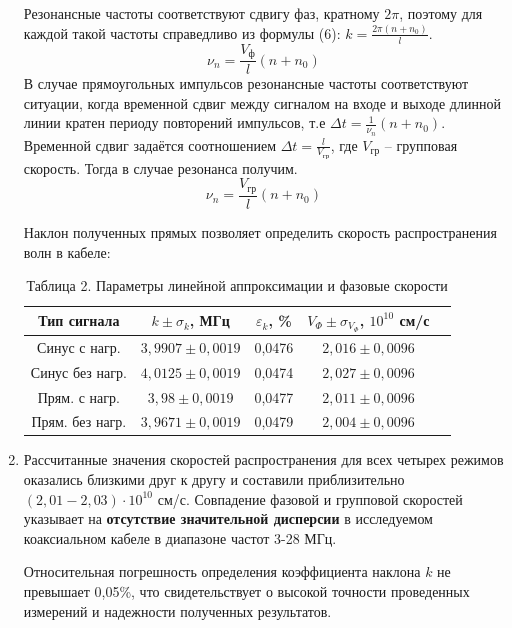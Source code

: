 \documentclass[a4paper]{article}
\begin{document}
\begin{enumerate}
Резонансные частоты соответствуют сдвигу фаз, кратному $2\pi$, поэтому для каждой такой частоты справедливо из формулы (6): $k=\frac{2\pi (n+n_0)}{l}$.  
\begin{equation}
 		\nu_n=\frac{V_\text{ф}}{l}(n+n_0)
	\end{equation}
В случае прямоугольных импульсов резонансные частоты соответствуют ситуации, когда
	временной сдвиг между сигналом на входе и выходе длинной линии кратен периоду
	повторений импульсов, т.е $\Delta t = \frac{1}{\nu_n}(n+n_0)$. Временной сдвиг задаётся соотношением
	$\Delta t=\frac{l}{V_\text{гр}}$, где $V_\text{гр}$ -- групповая скорость. Тогда в случае резонанса получим.
	\begin{equation}
		\nu_n=\frac{V_\text{гр}}{l}(n+n_0)
	\end{equation}

Наклон полученных прямых позволяет определить скорость распространения волн в кабеле:
 \clearpage
\begin{table}[h!]
    \centering
    \begin{tabular}{|c|c|c|c|c|}
        \hline
        Тип сигнала & $k \pm \sigma_k$, МГц & $\varepsilon_k$, \% & $V_{\Phi} \pm \sigma_{V_{\Phi}}$, $10^{10}$ см/с  \\ \hline
        Синус с нагр. & $3,9907 \pm 0,0019$ & 0,0476 & $2,016 \pm 0,0096$ \\ \hline
        Синус без нагр. & $4,0125 \pm 0,0019$ & 0,0474 & $2,027 \pm 0,0096$  \\ \hline
        Прям. с нагр. & $3,98 \pm 0,0019$ & 0,0477 & $2,011 \pm 0,0096$  \\ \hline
        Прям. без нагр. & $3,9671 \pm 0,0019$ & 0,0479 & $2,004 \pm 0,0096$ \\ \hline
    \end{tabular}
    \caption{Таблица 2. Параметры линейной аппроксимации и фазовые скорости}
    \label{tab:velocity_params}
\end{table}

\item Рассчитанные значения скоростей распространения для всех четырех режимов оказались близкими друг к другу и составили приблизительно $(2,01-2,03) \cdot 10^{10}$ см/с. Совпадение фазовой и групповой скоростей указывает на \textbf{отсутствие значительной дисперсии} в исследуемом коаксиальном кабеле в диапазоне частот 3-28 МГц.

Относительная погрешность определения коэффициента наклона $k$ не превышает 0,05\%, что свидетельствует о высокой точности проведенных измерений и надежности полученных результатов.


\end{enumerate}
\end{document}
